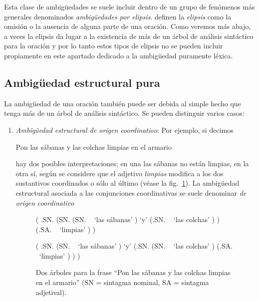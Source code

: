 \begin{enumerate}
Esta clase de ambigüedades se suele incluir dentro de un grupo de fenómenos más generales denominados \emph{ambigüedades por elipsis}. \citet{alcaraz97b} definen la \emph{elipsis}\label{pg:ellipsi} como la omisión o la ausencia de alguna parte de una oración. Como veremos más abajo, a veces la elipsis da lugar a la existencia de más de un árbol de análisis sintáctico para la oración y por lo tanto estos tipos de elipsis no se pueden incluir propiamente en este apartado dedicado a la ambigüedad puramente léxica. \end{enumerate} 

\subsection{Ambigüedad estructural pura} \label{ss:ambest} La ambigüedad de una oración también puede ser debida al simple hecho que tenga más de un árbol de análisis sintáctico. Se pueden distinguir varios casos: \begin{enumerate} \item \emph{Ambigüedad estructural de origen coordinativo}: Por ejemplo, si decimos \begin{exemple} Pon las sábanas y las colchas limpias en el armario \end{exemple} hay dos posibles interpretaciones; en una las sábanas no están limpias, en la otra sí, según se considere que el adjetivo \emph{limpias} modifica a los dos sustantivos coordinados o sólo al último (véase la fig.~\ref{fg:cobertors}). La ambigüedad estructural asociada a las conjunciones coordinativas se suele denominar \emph{de origen coordinativo} 

\begin{figure} \begin{center} \begin{parsetree} ( .SN. (SN. (SN. ~ `las sábanas' ) `y' (.SN. ~ `las colchas' ) ) (.SA. ~ `limpias' ) ) \end{parsetree} \end{center} \begin{center} \begin{parsetree} ( .SN. (SN. ~ `las sábanas' ) `y' (.SN. (SN. ~ `las colchas' ) (.SA. ~`limpias' ) ) ) \end{parsetree} \end{center} \caption{Dos árboles para la frase ``Pon las sábanas y las colchas limpias en el armario'' (SN = sintagma nominal, SA = sintagma adjetival).} \label{fg:cobertors} \end{figure} 


\end{enumerate}
